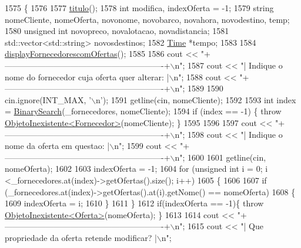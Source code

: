 \begin{DoxyCode}
1575 \{
1576 
1577     \hyperlink{classEmpresa_ad79f7196a8ce7256771cbd7b9542155c}{titulo}();
1578     \textcolor{keywordtype}{int} modifica, indexOferta = -1;
1579     \textcolor{keywordtype}{string} nomeCliente, nomeOferta, novonome, novobarco, novahora, novodestino, temp;
1580     \textcolor{keywordtype}{unsigned} \textcolor{keywordtype}{int} novopreco, novalotacao, novadistancia;
1581     std::vector<std::string> novosdestinos;
1582     \hyperlink{classTime}{Time} *tempo;
1583 
1584     \hyperlink{classEmpresa_aa47e9a64800a41180b7f374b73a1f32b}{displayFornecedorescomOfertas}();
1585     
1586     cout << \textcolor{stringliteral}{"+----------------------------------------------------------+\(\backslash\)n"};
1587     cout << \textcolor{stringliteral}{"| Indique o nome do fornecedor cuja oferta quer alterar:   |\(\backslash\)n"};
1588     cout << \textcolor{stringliteral}{"+----------------------------------------------------------+\(\backslash\)n"};
1589 
1590     cin.ignore(INT\_MAX, \textcolor{charliteral}{'\(\backslash\)n'});
1591     getline(cin, nomeCliente);
1592 
1593     \textcolor{keywordtype}{int} index = \hyperlink{extras_8h_abc85c93edf561168b5bbee8054caa388}{BinarySearch}(\_fornecedores, nomeCliente);
1594     \textcolor{keywordflow}{if} (index == -1) \{ \textcolor{keywordflow}{throw} \hyperlink{classObjetoInexistente}{ObjetoInexistente<Fornecedor>}(nomeCliente); \}
1595     
1596 
1597     cout << \textcolor{stringliteral}{"+----------------------------------------------------------+\(\backslash\)n"};
1598     cout << \textcolor{stringliteral}{"| Indique o nome da oferta em questao:                     |\(\backslash\)n"};
1599     cout << \textcolor{stringliteral}{"+----------------------------------------------------------+\(\backslash\)n"};
1600 
1601     getline(cin, nomeOferta);
1602 
1603     indexOferta = -1;
1604     \textcolor{keywordflow}{for} (\textcolor{keywordtype}{unsigned} \textcolor{keywordtype}{int} i = 0; i <\_fornecedores.at(index)->getOfertas().size(); i++)
1605     \{
1606         
1607         \textcolor{keywordflow}{if} (\_fornecedores.at(index)->getOfertas().at(i).getNome() == nomeOferta)
1608         \{
1609             indexOferta = i;
1610         \}
1611     \}
1612     \textcolor{keywordflow}{if}(indexOferta == -1)\{ \textcolor{keywordflow}{throw} \hyperlink{classObjetoInexistente}{ObjetoInexistente<Oferta>}(nomeOferta); \}
1613 
1614     cout << \textcolor{stringliteral}{"+----------------------------------------------------------+\(\backslash\)n"};
1615     cout << \textcolor{stringliteral}{"| Que propriedade da oferta retende modificar?             |\(\backslash\)n"};

\end{DoxyCode}
